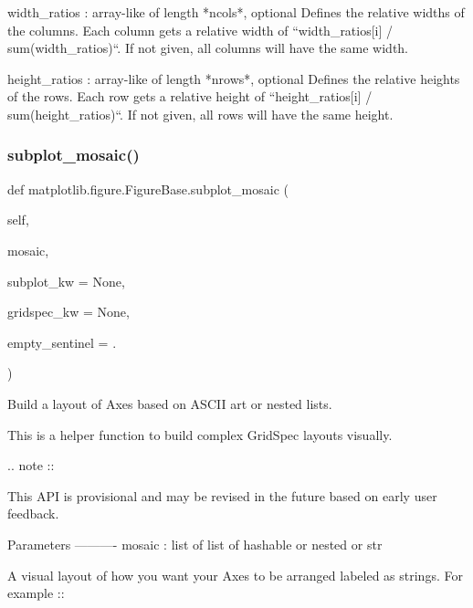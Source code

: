 \begin{DoxyVerb}
\begin{DoxyVerb}
\begin{DoxyVerb}
width_ratios : array-like of length *ncols*, optional
    Defines the relative widths of the columns. Each column gets a
    relative width of ``width_ratios[i] / sum(width_ratios)``.
    If not given, all columns will have the same width.

height_ratios : array-like of length *nrows*, optional
    Defines the relative heights of the rows. Each row gets a
    relative height of ``height_ratios[i] / sum(height_ratios)``.
    If not given, all rows will have the same height.
\end{DoxyVerb}
 \mbox{\label{classmatplotlib_1_1figure_1_1FigureBase_ad67a36dbb6f1968bff4a30e38d2e9cc2}} 
\subsubsection{\texorpdfstring{subplot\+\_\+mosaic()}{subplot\_mosaic()}}
{\footnotesize\ttfamily def matplotlib.\+figure.\+Figure\+Base.\+subplot\+\_\+mosaic (\begin{DoxyParamCaption}\item[{}]{self,  }\item[{}]{mosaic,  }\item[{}]{subplot\+\_\+kw = {\ttfamily None},  }\item[{}]{gridspec\+\_\+kw = {\ttfamily None},  }\item[{}]{empty\+\_\+sentinel = {\ttfamily \textquotesingle{}.\textquotesingle{}} }\end{DoxyParamCaption})}

\begin{DoxyVerb}Build a layout of Axes based on ASCII art or nested lists.

This is a helper function to build complex GridSpec layouts visually.

.. note ::

   This API is provisional and may be revised in the future based on
   early user feedback.


Parameters
----------
mosaic : list of list of {hashable or nested} or str

    A visual layout of how you want your Axes to be arranged
    labeled as strings.  For example ::


\end{DoxyVerb}
\end{DoxyVerb}
\end{DoxyVerb}
